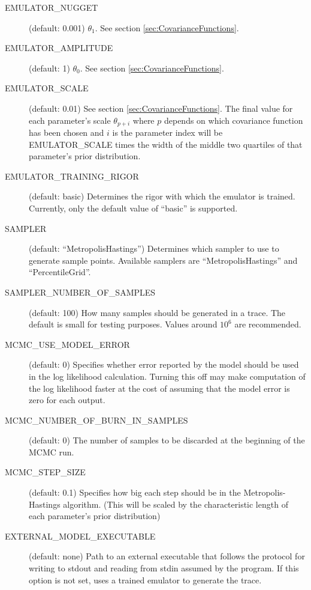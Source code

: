 \begin{description}
    \item[EMULATOR\_NUGGET] (default: 0.001) $\theta_1$. See section \ref{sec:CovarianceFunctions}.

    \item[EMULATOR\_AMPLITUDE] (default: 1) $\theta_0$. See section \ref{sec:CovarianceFunctions}.

    \item[EMULATOR\_SCALE] (default: 0.01) See section \ref{sec:CovarianceFunctions}. The final value for each parameter's scale $\theta_{p+i}$ where $p$ depends on which covariance function has been chosen and $i$ is the parameter index will be EMULATOR\_SCALE times the width of the middle two quartiles of that parameter's prior distribution.

    \item[EMULATOR\_TRAINING\_RIGOR] (default: basic) Determines the rigor with which the emulator is trained. Currently, only the default value of ``basic'' is supported.

    \item[SAMPLER] (default: ``MetropolisHastings'') Determines which sampler to use to generate sample points. Available samplers are ``MetropolisHastings'' and ``PercentileGrid''.

    \item[SAMPLER\_NUMBER\_OF\_SAMPLES] (default: 100) How many samples should be generated in a trace. The default is small for testing purposes. Values around $10^6$ are recommended.

    \item[MCMC\_USE\_MODEL\_ERROR] (default: 0) Specifies whether error reported by the model should be used in the log likelihood calculation. Turning this off may make computation of the log likelihood faster at the cost of assuming that the model error is zero for each output.

    \item[MCMC\_NUMBER\_OF\_BURN\_IN\_SAMPLES] (default: 0) The number of samples to be discarded at the beginning of the MCMC run.

    \item[MCMC\_STEP\_SIZE] (default: 0.1) Specifies how big each step should be in the Metropolis-Hastings algorithm. (This will be scaled by the characteristic length of each parameter's prior distribution)

    \item[EXTERNAL\_MODEL\_EXECUTABLE] (default: none) Path to an external executable that follows the protocol for writing to stdout and reading from stdin assumed by the  program. If this option is not set,  uses a trained emulator to generate the trace.


\end{description}
